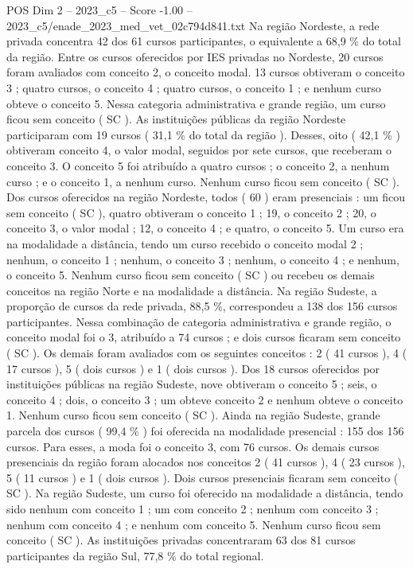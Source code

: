 \begin{textsample}{POS Dim 2 – 2023\_c5 – Score -1.00 – 2023\_c5/enade\_2023\_med\_vet\_02c794d841.txt}
Na região Nordeste, a rede privada concentra 42 dos 61 cursos participantes, o equivalente a 68,9 \% do total da região.
Entre os cursos oferecidos por IES privadas no Nordeste, 20 cursos foram avaliados com conceito 2, o conceito modal. 13 cursos obtiveram o conceito 3 ; quatro cursos, o conceito 4 ; quatro cursos, o conceito 1 ; e nenhum curso obteve o conceito 5.
Nessa categoria administrativa e grande região, um curso ficou sem conceito ( SC ).
As instituições públicas da região Nordeste participaram com 19 cursos ( 31,1 \% do total da região ).
Desses, oito ( 42,1 \% ) obtiveram conceito 4, o valor modal, seguidos por sete cursos, que receberam o conceito 3.
O conceito 5 foi atribuído a quatro cursos ; o conceito 2, a nenhum curso ; e o conceito 1, a nenhum curso.
Nenhum curso ficou sem conceito ( SC ).
Dos cursos oferecidos na região Nordeste, todos ( 60 ) eram presenciais : um ficou sem conceito ( SC ), quatro obtiveram o conceito 1 ; 19, o conceito 2 ; 20, o conceito 3, o valor modal ; 12, o conceito 4 ; e quatro, o conceito 5.
Um curso era na modalidade a distância, tendo um curso recebido o conceito modal 2 ; nenhum, o conceito 1 ; nenhum, o conceito 3 ; nenhum, o conceito 4 ; e nenhum, o conceito 5.
Nenhum curso ficou sem conceito ( SC ) ou recebeu os demais conceitos na região Norte e na modalidade a distância.
Na região Sudeste, a proporção de cursos da rede privada, 88,5 \%, correspondeu a 138 dos 156 cursos participantes.
Nessa combinação de categoria administrativa e grande região, o conceito modal foi o 3, atribuído a 74 cursos ; e dois cursos ficaram sem conceito ( SC ).
Os demais foram avaliados com os seguintes conceitos : 2 ( 41 cursos ), 4 ( 17 cursos ), 5 ( dois cursos ) e 1 ( dois cursos ).
Dos 18 cursos oferecidos por instituições públicas na região Sudeste, nove obtiveram o conceito 5 ; seis, o conceito 4 ; dois, o conceito 3 ; um obteve conceito 2 e nenhum obteve o conceito 1.
Nenhum curso ficou sem conceito ( SC ).
Ainda na região Sudeste, grande parcela dos cursos ( 99,4 \% ) foi oferecida na modalidade presencial : 155 dos 156 cursos.
Para esses, a moda foi o conceito 3, com 76 cursos.
Os demais cursos presenciais da região foram alocados nos conceitos 2 ( 41 cursos ), 4 ( 23 cursos ), 5 ( 11 cursos ) e 1 ( dois cursos ).
Dois cursos presenciais ficaram sem conceito ( SC ).
Na região Sudeste, um curso foi oferecido na modalidade a distância, tendo sido nenhum com conceito 1 ; um com conceito 2 ; nenhum com conceito 3 ; nenhum com conceito 4 ; e nenhum com conceito 5.
Nenhum curso ficou sem conceito ( SC ).
As instituições privadas concentraram 63 dos 81 cursos participantes da região Sul, 77,8 \% do total regional.

\end{textsample}
